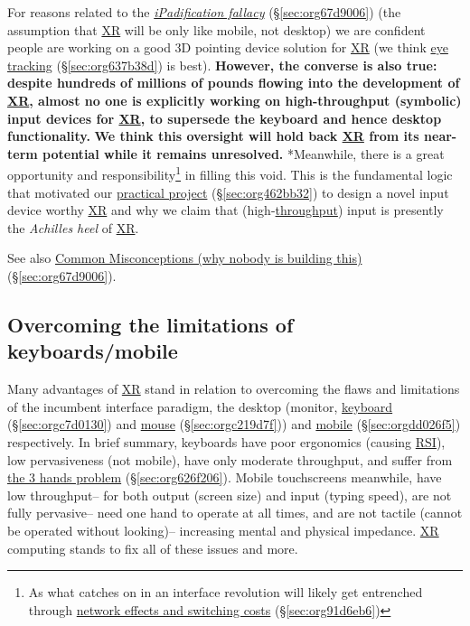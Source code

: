\documentclass[logo,bsc,singlespacing,parskip]{infthesis}
\begin{document}
For reasons related to the \emph{\hyperref[ipadification fallacy]{iPadification fallacy}} (\S \ref{sec:org67d9006}) (the assumption that \hyperref[org1d567af]{XR} will be only like mobile, not desktop) we are confident people are working on a good 3D pointing device solution for \hyperref[org1d567af]{XR} (we think \hyperref[sec:org637b38d]{eye tracking} (\S \ref{sec:org637b38d}) is best).
\textbf{However, the converse is also true: despite hundreds of millions of pounds flowing into the development of \hyperref[org1d567af]{XR}, almost no one is explicitly working on high-throughput (symbolic) input devices for \hyperref[org1d567af]{XR}, to supersede the keyboard and hence desktop functionality.}
\textbf{We think this oversight will hold back \hyperref[org1d567af]{XR} from its near-term potential while it remains unresolved.}
*Meanwhile, there is a great opportunity and responsibility\footnote{As what catches on in an interface revolution will likely get entrenched through \hyperref[sec:org91d6eb6]{network effects and switching costs} (\S \ref{sec:org91d6eb6})} in filling this void.
This is the fundamental logic that motivated our \hyperref[sec:org462bb32]{practical project} (\S \ref{sec:org462bb32}) to design a novel input device worthy \hyperref[org1d567af]{XR} and why we claim that (high-\hyperref[throughput]{throughput}) input is presently the \emph{Achilles heel} of \hyperref[org1d567af]{XR}.

See also \hyperref[sec:org67d9006]{Common Misconceptions (why nobody is building this)} (\S \ref{sec:org67d9006}).
\subsection{Overcoming the limitations of keyboards/mobile}
\label{sec:orgb907e89}
Many advantages of \hyperref[org1d567af]{XR} stand in relation to overcoming the flaws and limitations of the incumbent interface paradigm, the desktop (monitor, \hyperref[sec:orgc7d0130]{keyboard} (\S \ref{sec:orgc7d0130}) and \hyperref[sec:orgc219d7f]{mouse} (\S \ref{sec:orgc219d7f})) and \hyperref[sec:orgdd026f5]{mobile} (\S \ref{sec:orgdd026f5}) respectively.
In brief summary, keyboards have poor ergonomics (causing \hyperref[orgdb95c62]{RSI}), low pervasiveness (not mobile), have only moderate throughput, and suffer from \hyperref[sec:org626f206]{the 3 hands problem} (\S \ref{sec:org626f206}).
Mobile touchscreens meanwhile, have low throughput-- for both output (screen size) and input (typing speed), are not fully pervasive-- need one hand to operate at all times, and are not tactile (cannot be operated without looking)-- increasing mental and physical impedance.
\hyperref[org1d567af]{XR} computing stands to fix all of these issues and more.
\end{document}
